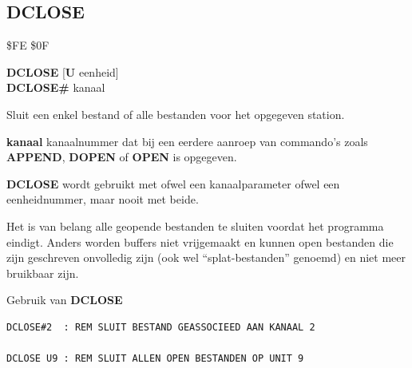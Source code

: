 \subsection{DCLOSE}
\begin{description}[leftmargin=2cm,style=nextline]
\item [Token:]    \$FE \$0F

\item [Formaat:]   {\bf DCLOSE} [{\bf U} eenheid] \\		            {\bf DCLOSE\#} kanaal

\item [Gebruik:]    Sluit een enkel bestand of alle bestanden voor het opgegeven station.

{\bf kanaal} kanaalnummer dat bij een eerdere aanroep van commando's zoals {\bf APPEND}, {\bf DOPEN} of {\bf OPEN} is opgegeven.

                  \unitdefinition

                  {\bf DCLOSE} wordt gebruikt met ofwel een kanaalparameter ofwel een eenheidnummer, maar nooit met beide.

\item [Opmerkingen:]  Het is van belang alle geopende bestanden te sluiten voordat het programma eindigt. Anders worden buffers niet vrijgemaakt en kunnen open bestanden die zijn geschreven onvolledig zijn (ook wel ``splat-bestanden'' genoemd) en niet meer bruikbaar zijn.

\item [Voorbeelden:] Gebruik van {\bf DCLOSE}

\begin{tcolorbox}[colback=black,coltext=white]
\verbatimfont{\codefont}
\begin{verbatim}
DCLOSE#2  : REM SLUIT BESTAND GEASSOCIEED AAN KANAAL 2

DCLOSE U9 : REM SLUIT ALLEN OPEN BESTANDEN OP UNIT 9
\end{verbatim}
\end{tcolorbox}
\end{description}


\newpage
